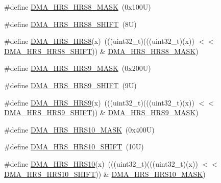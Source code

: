 \begin{DoxyCompactItemize}
\#define \mbox{\hyperlink{group___d_m_a___register___masks_ga1ac1e668583047830217733a86cb5282}{D\+M\+A\+\_\+\+H\+R\+S\+\_\+\+H\+R\+S8\+\_\+\+M\+A\+SK}}~(0x100\+U)
\item 
\#define \mbox{\hyperlink{group___d_m_a___register___masks_gac2ad334ca6ffd1da266db7274904744b}{D\+M\+A\+\_\+\+H\+R\+S\+\_\+\+H\+R\+S8\+\_\+\+S\+H\+I\+FT}}~(8\+U)
\item 
\#define \mbox{\hyperlink{group___d_m_a___register___masks_ga7c4afcc9768ed5f8c4aa13bcd2c9f689}{D\+M\+A\+\_\+\+H\+R\+S\+\_\+\+H\+R\+S8}}(x)~(((uint32\+\_\+t)(((uint32\+\_\+t)(x)) $<$$<$ \mbox{\hyperlink{group___d_m_a___register___masks_gac2ad334ca6ffd1da266db7274904744b}{D\+M\+A\+\_\+\+H\+R\+S\+\_\+\+H\+R\+S8\+\_\+\+S\+H\+I\+FT}})) \& \mbox{\hyperlink{group___d_m_a___register___masks_ga1ac1e668583047830217733a86cb5282}{D\+M\+A\+\_\+\+H\+R\+S\+\_\+\+H\+R\+S8\+\_\+\+M\+A\+SK}})
\item 
\#define \mbox{\hyperlink{group___d_m_a___register___masks_ga74fabb7978d0300a9a53ce9623cd4ec0}{D\+M\+A\+\_\+\+H\+R\+S\+\_\+\+H\+R\+S9\+\_\+\+M\+A\+SK}}~(0x200\+U)
\item 
\#define \mbox{\hyperlink{group___d_m_a___register___masks_ga0bf0fb7b7d09669eb6d9494cbd820283}{D\+M\+A\+\_\+\+H\+R\+S\+\_\+\+H\+R\+S9\+\_\+\+S\+H\+I\+FT}}~(9\+U)
\item 
\#define \mbox{\hyperlink{group___d_m_a___register___masks_ga924385d59b42400e7e74ac7937a5d658}{D\+M\+A\+\_\+\+H\+R\+S\+\_\+\+H\+R\+S9}}(x)~(((uint32\+\_\+t)(((uint32\+\_\+t)(x)) $<$$<$ \mbox{\hyperlink{group___d_m_a___register___masks_ga0bf0fb7b7d09669eb6d9494cbd820283}{D\+M\+A\+\_\+\+H\+R\+S\+\_\+\+H\+R\+S9\+\_\+\+S\+H\+I\+FT}})) \& \mbox{\hyperlink{group___d_m_a___register___masks_ga74fabb7978d0300a9a53ce9623cd4ec0}{D\+M\+A\+\_\+\+H\+R\+S\+\_\+\+H\+R\+S9\+\_\+\+M\+A\+SK}})
\item 
\#define \mbox{\hyperlink{group___d_m_a___register___masks_ga3f6a957f6d04efec97e3b3a3e69cb393}{D\+M\+A\+\_\+\+H\+R\+S\+\_\+\+H\+R\+S10\+\_\+\+M\+A\+SK}}~(0x400\+U)
\item 
\#define \mbox{\hyperlink{group___d_m_a___register___masks_ga778c5e6d66d2e4f37e16b2ec8f27ec60}{D\+M\+A\+\_\+\+H\+R\+S\+\_\+\+H\+R\+S10\+\_\+\+S\+H\+I\+FT}}~(10\+U)
\item 
\#define \mbox{\hyperlink{group___d_m_a___register___masks_ga741fa4de4c929f3c094c14e29040996d}{D\+M\+A\+\_\+\+H\+R\+S\+\_\+\+H\+R\+S10}}(x)~(((uint32\+\_\+t)(((uint32\+\_\+t)(x)) $<$$<$ \mbox{\hyperlink{group___d_m_a___register___masks_ga778c5e6d66d2e4f37e16b2ec8f27ec60}{D\+M\+A\+\_\+\+H\+R\+S\+\_\+\+H\+R\+S10\+\_\+\+S\+H\+I\+FT}})) \& \mbox{\hyperlink{group___d_m_a___register___masks_ga3f6a957f6d04efec97e3b3a3e69cb393}{D\+M\+A\+\_\+\+H\+R\+S\+\_\+\+H\+R\+S10\+\_\+\+M\+A\+SK}})
$$
\end{DoxyCompactItemize}
